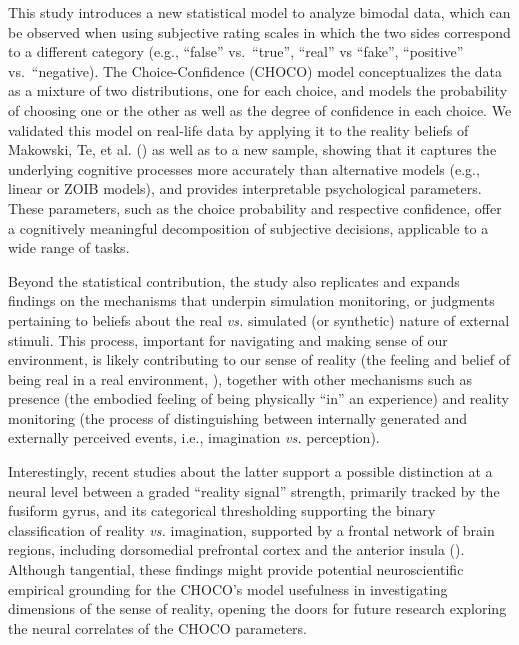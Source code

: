 \documentclass[
  jou,
  floatsintext,
  longtable,
  nolmodern,
  notxfonts,
  notimes,
  colorlinks=true,linkcolor=blue,citecolor=blue,urlcolor=blue]{apa7}
\begin{document}
This study introduces a new statistical model to analyze bimodal data,
which can be observed when using subjective rating scales in which the
two sides correspond to a different category (e.g., ``false''
vs.~``true'', ``real'' vs ``fake'', ``positive'' vs.~``negative). The
Choice-Confidence (CHOCO) model conceptualizes the data as a mixture of
two distributions, one for each choice, and models the probability of
choosing one or the other as well as the degree of confidence in each
choice. We validated this model on real-life data by applying it to the
reality beliefs of Makowski, Te, et al.
() as well as to a new sample,
showing that it captures the underlying cognitive processes more
accurately than alternative models (e.g., linear or ZOIB models), and
provides interpretable psychological parameters. These parameters, such
as the choice probability and respective confidence, offer a cognitively
meaningful decomposition of subjective decisions, applicable to a wide
range of tasks.

Beyond the statistical contribution, the study also replicates and
expands findings on the mechanisms that underpin simulation monitoring,
or judgments pertaining to beliefs about the real \emph{vs.} simulated
(or synthetic) nature of external stimuli. This process, important for
navigating and making sense of our environment, is likely contributing
to our sense of reality (the feeling and belief of being real in a real
environment, ),
together with other mechanisms such as presence (the embodied feeling of
being physically ``in'' an experience) and reality monitoring (the
process of distinguishing between internally generated and externally
perceived events, i.e., imagination \emph{vs.} perception).

Interestingly, recent studies about the latter support a possible
distinction at a neural level between a graded ``reality signal''
strength, primarily tracked by the fusiform gyrus, and its categorical
thresholding supporting the binary classification of reality \emph{vs.}
imagination, supported by a frontal network of brain regions, including
dorsomedial prefrontal cortex and the anterior insula
(). Although
tangential, these findings might provide potential neuroscientific
empirical grounding for the CHOCO's model usefulness in investigating
dimensions of the sense of reality, opening the doors for future
research exploring the neural correlates of the CHOCO parameters.
\end{document}
